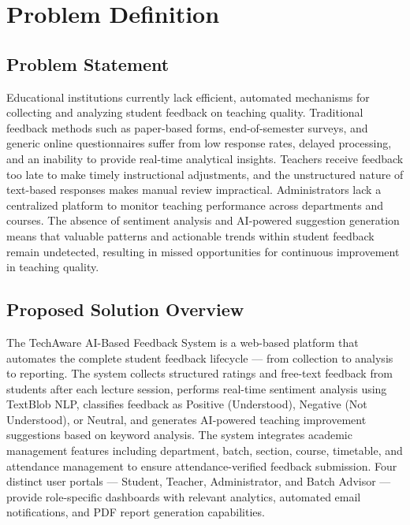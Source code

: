 
\chapter{Problem Definition}

\section{Problem Statement}

Educational institutions currently lack efficient, automated mechanisms for collecting and analyzing student feedback on teaching quality. Traditional feedback methods such as paper-based forms, end-of-semester surveys, and generic online questionnaires suffer from low response rates, delayed processing, and an inability to provide real-time analytical insights. Teachers receive feedback too late to make timely instructional adjustments, and the unstructured nature of text-based responses makes manual review impractical. Administrators lack a centralized platform to monitor teaching performance across departments and courses. The absence of sentiment analysis and AI-powered suggestion generation means that valuable patterns and actionable trends within student feedback remain undetected, resulting in missed opportunities for continuous improvement in teaching quality.




\section{Proposed Solution Overview}

The TechAware AI-Based Feedback System is a web-based platform that automates the complete student feedback lifecycle — from collection to analysis to reporting. The system collects structured ratings and free-text feedback from students after each lecture session, performs real-time sentiment analysis using TextBlob NLP, classifies feedback as Positive (Understood), Negative (Not Understood), or Neutral, and generates AI-powered teaching improvement suggestions based on keyword analysis. The system integrates academic management features including department, batch, section, course, timetable, and attendance management to ensure attendance-verified feedback submission. Four distinct user portals — Student, Teacher, Administrator, and Batch Advisor — provide role-specific dashboards with relevant analytics, automated email notifications, and PDF report generation capabilities.



